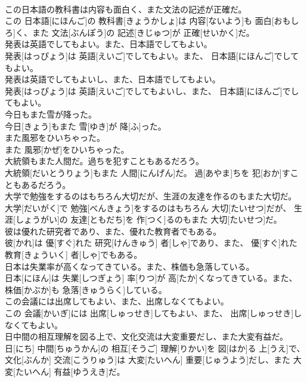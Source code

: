 \documentclass[8pt]{extreport}
\begin{document}
\begin{CJK}{UTF8}{min}
\\	この日本語の教科書は内容も面白く、また文法の記述が正確だ。	
\\	この 日本語[にほんご]の 教科書[きょうかしょ]は 内容[ないよう]も 面白[おもしろ]く、また 文法[ぶんぽう]の 記述[きじゅつ]が 正確[せいかく]だ。
\\	発表は英語でしてもよい。また、日本語でしてもよい。	
\\	発表[はっぴょう]は 英語[えいご]でしてもよい。また、 日本語[にほんご]でしてもよい。
\\	発表は英語でしてもよいし、また、日本語でしてもよい。	
\\	発表[はっぴょう]は 英語[えいご]でしてもよいし、また、 日本語[にほんご]でしてもよい。
\\	今日もまた雪が降った。	
\\	今日[きょう]もまた 雪[ゆき]が 降[ふ]った。
\\	また風邪をひいちゃった。	
\\	また 風邪[かぜ]をひいちゃった。
\\	大統領もまた人間だ。過ちを犯すこともあるだろう。	
\\	大統領[だいとうりょう]もまた 人間[にんげん]だ。 過[あやま]ちを 犯[おか]すこともあるだろう。
\\	大学で勉強をするのはもちろん大切だが、生涯の友達を作るのもまた大切だ。	
\\	大学[だいがく]で 勉強[べんきょう]をするのはもちろん 大切[たいせつ]だが、 生涯[しょうがい]の 友達[ともだち]を 作[つく]るのもまた 大切[たいせつ]だ。
\\	彼は優れた研究者であり、また、優れた教育者でもある。	
\\	彼[かれ]は 優[すぐ]れた 研究[けんきゅう] 者[しゃ]であり、また、 優[すぐ]れた 教育[きょういく] 者[しゃ]でもある。
\\	日本は失業率が高くなってきている。また、株価も急落している。	
\\	日本[にほん]は 失業[しつぎょう] 率[りつ]が 高[たか]くなってきている。また、 株価[かぶか]も 急落[きゅうらく]している。
\\	この会議には出席してもよい、また、出席しなくてもよい。	
\\	この 会議[かいぎ]には 出席[しゅっせき]してもよい、また、 出席[しゅっせき]しなくてもよい。
\\	日中間の相互理解を図る上で、文化交流は大変重要だし、また大変有益だ。	
\\	日[にち] 中間[ちゅうかん]の 相互[そうご] 理解[りかい]を 図[はか]る 上[うえ]で、 文化[ぶんか] 交流[こうりゅう]は 大変[たいへん] 重要[じゅうよう]だし、また 大変[たいへん] 有益[ゆうえき]だ。

\end{CJK}
\end{document}
